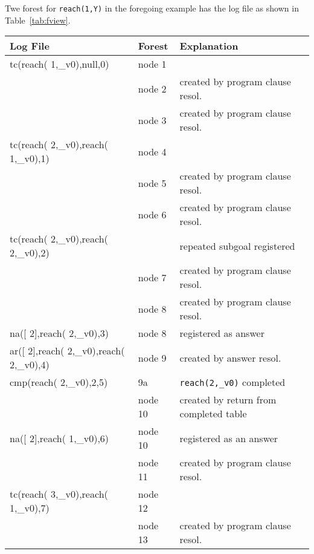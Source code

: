 \begin{example}
Twe forest for {\tt reach(1,Y)} in the foregoing example has the log
file as shown in Table~\ref{tab:fview}.

\begin{table}[htbp]
\begin{tabular}{lll}               \\ \hline  
Log File                                     & Forest & Explanation\\ \hline 
tc(reach( 1,\_v0),null,0)                   & node 1 & \\
                                             & node 2 & created by program clause resol. \\
                                             & node 3 & created by program clause resol. \\
tc(reach( 2,\_v0),reach( 1,\_v0),1)         & node 4 & \\
                                             & node 5 & created by program clause resol.\\
                                             & node 6 & created by program clause resol. \\
tc(reach( 2,\_v0),reach( 2,\_v0),2)         &        & repeated subgoal registered\\
                                             & node 7 & created by program clause resol. \\
                                             & node 8 & created by program clause resol. \\
na([ 2],reach( 2,\_v0),3)                   & node 8 & registered as answer\\
ar([ 2],reach( 2,\_v0),reach( 2,\_v0),4)      & node 9 & created by answer resol.\\
cmp(reach( 2,\_v0),2,5)                     &    9a   & {\tt reach(2,\_v0)} completed \\
                                             & node 10 & created by return from completed table \\
na([ 2],reach( 1,\_v0),6)                    & node 10 & registered as an answer\\
                                             & node 11 & created by program clause resol. \\
tc(reach( 3,\_v0),reach( 1,\_v0),7)           & node 12 & \\
                                             & node 13 & created by program clause resol. \\

\end{tabular}
\end{table}
\end{example}
